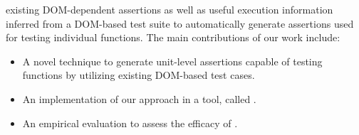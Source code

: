 existing DOM-dependent assertions as well as useful execution information inferred from a DOM-based test suite to automatically generate assertions used for testing individual \javascript functions. The main contributions of our work include:
\begin{itemize}
\item A novel technique to generate unit-level assertions capable of testing \javascript functions by utilizing existing DOM-based test cases.
\item An implementation of our approach in a tool, called \tool. 
\item An empirical evaluation to assess the efficacy of \tool.
\end{itemize}
    






